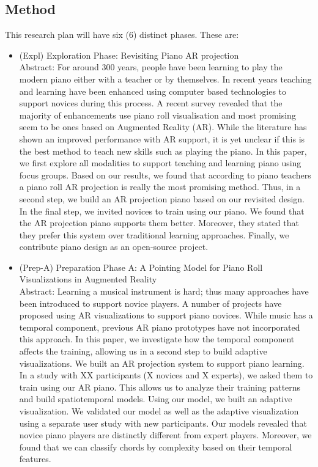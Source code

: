 \documentclass[manuscript,screen]{acmart}
\begin{document}
\subsection{Method}
This research plan will have six (6) distinct phases. These are:
\begin{itemize}
    \item (Expl) Exploration Phase: Revisiting Piano AR projection\\
    Abstract: For around 300 years, people have been learning to play the modern piano either with a teacher or by themselves. In recent years teaching and learning have been enhanced using computer based technologies to support novices during this process. A recent survey revealed that the majority of enhancements use piano roll visualisation and most promising seem to be ones based on Augmented Reality (AR). While the literature has shown an improved performance with AR support, it is yet unclear if this is the best method to teach new skills such as playing the piano. In this paper, we first explore all modalities to support teaching and learning piano using focus groups. Based on our results, we found that according to piano teachers a piano roll AR projection is really the most promising method. Thus, in a second step, we build an AR projection piano based on our revisited design. In the final step, we invited novices to train using our piano. We found that the AR projection piano supports them better. Moreover, they stated that they prefer this system over traditional learning approaches. Finally, we contribute piano design as an open-source project.
    \item (Prep-A) Preparation Phase A: A Pointing Model for Piano Roll Visualizations in Augmented Reality\\
    Abstract: Learning a musical instrument is hard; thus many approaches have been introduced to support novice players. A number of projects have proposed using AR visualizations to support piano novices. While music has a temporal component, previous AR piano prototypes have not incorporated this approach. In this paper, we investigate how the temporal component affects the training, allowing us in a second step to build adaptive visualizations. We built an AR projection system to support piano learning. In a study with XX participants (X novices and X experts), we asked them to train using our AR piano. This allows us to analyze their training patterns and build spatiotemporal models. Using our model, we built an adaptive visualization. We validated our model as well as the adaptive visualization using a separate user study with new participants. Our models revealed that novice piano players are distinctly different from expert players. Moreover, we found that we can classify chords by complexity based on their temporal features. 

\end{itemize}
\end{document}
